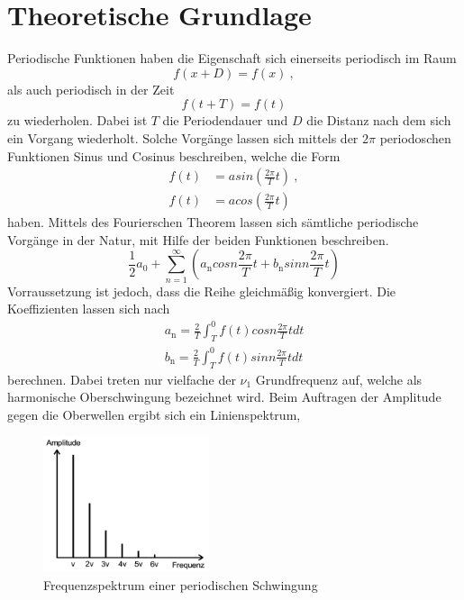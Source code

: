 \section{Theoretische Grundlage}
\label{sec:Theorie}
Periodische Funktionen haben die Eigenschaft sich einerseits periodisch im Raum
\begin{equation}
  f(x + D) = f(x) \ ,
  \label{eqn:f(x)}
\end{equation}
als auch periodisch in der Zeit
\begin{equation}
  f(t + T) =f(t)
  \label{eqn:f(t)}
\end{equation}
zu wiederholen. Dabei ist $T$ die Periodendauer und $D$ die Distanz nach dem sich ein Vorgang wiederholt. Solche Vorgänge lassen sich mittels der $2 \pi$ periodoschen Funktionen Sinus und Cosinus beschreiben, welche die Form
\begin{eqnarray}
  f(t) & = a sin \left( \frac{2 \pi}{T} t \right) \ ,	\\
  f(t) & = a cos \left( \frac{2 \pi}{T} t \right)
  \label{eqn:sin}
\end{eqnarray}
haben. Mittels des Fourierschen Theorem lassen sich sämtliche periodische Vorgänge in der Natur, mit Hilfe der beiden Funktionen beschreiben.
\begin{equation}
  \frac{1}{2} a_0 + \sum^{\infty}_{n=1} \left( a_\text{n} cos n \frac{2 \pi}{T} t + b_\text{n} sin n \frac{2 \pi}{T} t \right)
  \label{eqn:fourier}
\end{equation}
Vorraussetzung ist jedoch, dass die Reihe gleichmäßig konvergiert. Die Koeffizienten lassen sich nach
\begin{eqnarray}
  a_\text{n} = \frac{2}{T} \int^0_T f(t) cos n \frac{2 \pi}{T} t dt	\\
  b_\text{n} = \frac{2}{T} \int^0_T f(t) sin n \frac{2 \pi}{T} t dt
  \label{eqn:Koef}
\end{eqnarray}
berechnen. Dabei treten nur vielfache der $\nu_1$ Grundfrequenz auf, welche als harmonische Oberschwingung bezeichnet wird. Beim Auftragen der Amplitude gegen die Oberwellen ergibt sich ein Linienspektrum,
\begin{figure}
  \centering
  \includegraphics[height=4cm]{picture/Frequenzspektrum.png}
  \caption{Frequenzspektrum einer periodischen Schwingung}
  \label{fig:fre}
\end{figure}
